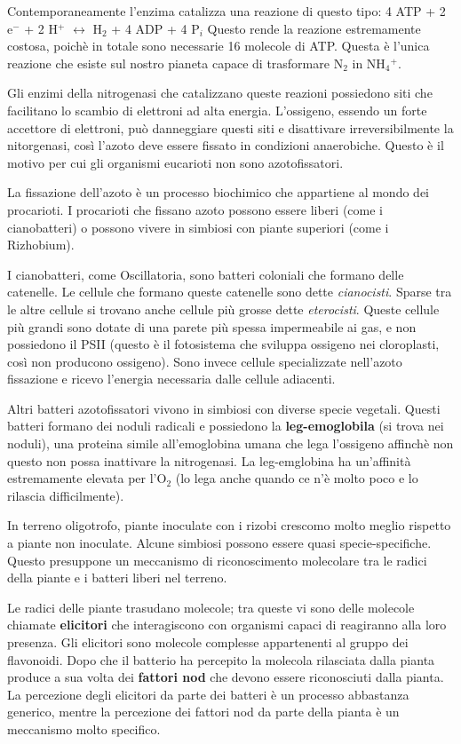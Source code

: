 \documentclass[]{article}
\begin{document}
Contemporaneamente l'enzima catalizza una reazione di questo tipo: 4 ATP
+ 2 e$^-$ + 2 H$^+$ $\longleftrightarrow$ H$_2$ + 4 ADP + 4 P$_i$ Questo
rende la reazione estremamente costosa, poichè in totale sono necessarie
16 molecole di ATP. Questa è l'unica reazione che esiste sul nostro
pianeta capace di trasformare N$_2$ in NH$_4$$^+$.

Gli enzimi della nitrogenasi che catalizzano queste reazioni possiedono
siti che facilitano lo scambio di elettroni ad alta energia. L'ossigeno,
essendo un forte accettore di elettroni, può danneggiare questi siti e
disattivare irreversibilmente la nitorgenasi, così l'azoto deve essere
fissato in condizioni anaerobiche. Questo è il motivo per cui gli
organismi eucarioti non sono azotofissatori.

La fissazione dell'azoto è un processo biochimico che appartiene al
mondo dei procarioti. I procarioti che fissano azoto possono essere
liberi (come i cianobatteri) o possono vivere in simbiosi con piante
superiori (come i Rizhobium).

I cianobatteri, come Oscillatoria, sono batteri coloniali che formano
delle catenelle. Le cellule che formano queste catenelle sono dette
\emph{cianocisti}. Sparse tra le altre cellule si trovano anche cellule
più grosse dette \emph{eterocisti}. Queste cellule più grandi sono
dotate di una parete più spessa impermeabile ai gas, e non possiedono il
PSII (questo è il fotosistema che sviluppa ossigeno nei cloroplasti,
così non producono ossigeno). Sono invece cellule specializzate
nell'azoto fissazione e ricevo l'energia necessaria dalle cellule
adiacenti.

Altri batteri azotofissatori vivono in simbiosi con diverse specie
vegetali. Questi batteri formano dei noduli radicali e possiedono la
\textbf{leg-emoglobila} (si trova nei noduli), una proteina simile
all'emoglobina umana che lega l'ossigeno affinchè non questo non possa
inattivare la nitrogenasi. La leg-emglobina ha un'affinità estremamente
elevata per l'O$_2$ (lo lega anche quando ce n'è molto poco e lo
rilascia difficilmente).

In terreno oligotrofo, piante inoculate con i rizobi crescomo molto
meglio rispetto a piante non inoculate. Alcune simbiosi possono essere
quasi specie-specifiche. Questo presuppone un meccanismo di
riconoscimento molecolare tra le radici della piante e i batteri liberi
nel terreno.

Le radici delle piante trasudano molecole; tra queste vi sono delle
molecole chiamate \textbf{elicitori} che interagiscono con organismi
capaci di reagiranno alla loro presenza. Gli elicitori sono molecole
complesse appartenenti al gruppo dei flavonoidi. Dopo che il batterio ha
percepito la molecola rilasciata dalla pianta produce a sua volta dei
\textbf{fattori nod} che devono essere riconosciuti dalla pianta. La
percezione degli elicitori da parte dei batteri è un processo abbastanza
generico, mentre la percezione dei fattori nod da parte della pianta è
un meccanismo molto specifico.
\end{document}
